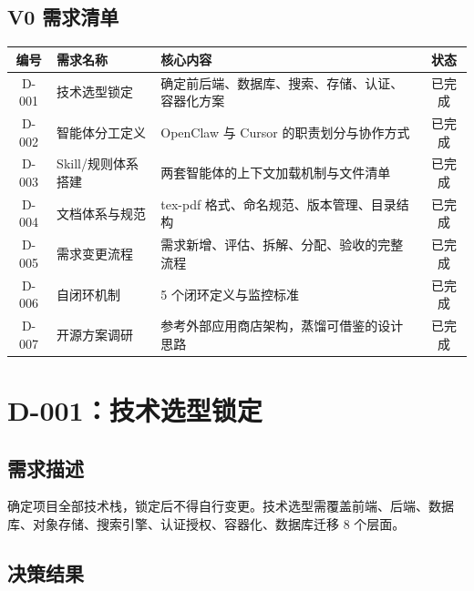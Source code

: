 \documentclass[11pt,a4paper]{article}
\begin{document}
\subsection{V0 需求清单}

\begin{table}[h]
\centering
\begin{tabular}{clp{4.5cm}c}
\toprule
\textbf{编号} & \textbf{需求名称} & \textbf{核心内容} & \textbf{状态} \\
\midrule
D-001 & 技术选型锁定 & 确定前后端、数据库、搜索、存储、认证、容器化方案 & \textcolor{success}{已完成} \\
D-002 & 智能体分工定义 & OpenClaw 与 Cursor 的职责划分与协作方式 & \textcolor{success}{已完成} \\
D-003 & Skill/规则体系搭建 & 两套智能体的上下文加载机制与文件清单 & \textcolor{success}{已完成} \\
D-004 & 文档体系与规范 & tex-pdf 格式、命名规范、版本管理、目录结构 & \textcolor{success}{已完成} \\
D-005 & 需求变更流程 & 需求新增、评估、拆解、分配、验收的完整流程 & \textcolor{success}{已完成} \\
D-006 & 自闭环机制 & 5 个闭环定义与监控标准 & \textcolor{success}{已完成} \\
D-007 & 开源方案调研 & 参考外部应用商店架构，蒸馏可借鉴的设计思路 & \textcolor{success}{已完成} \\
\bottomrule
\end{tabular}
\end{table}

\section{D-001：技术选型锁定}

\subsection{需求描述}

确定项目全部技术栈，锁定后不得自行变更。技术选型需覆盖前端、后端、数据库、对象存储、搜索引擎、认证授权、容器化、数据库迁移 8 个层面。

\subsection{决策结果}
\end{document}
